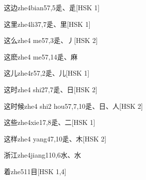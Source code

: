 \begin{entry}{这边}{zhe4bian5}{7,5}{⾡、⾡}[HSK 1]
\end{entry}

\begin{entry}{这里}{zhe4li3}{7,7}{⾡、⾥}[HSK 1]
\end{entry}

\begin{entry}{这么}{zhe4 me5}{7,3}{⾡、⼃}[HSK 2]
\end{entry}

\begin{entry}{这麽}{zhe4 me5}{7,14}{⾡、⿇}
\end{entry}

\begin{entry}{这儿}{zhe4r5}{7,2}{⾡、⼉}[HSK 1]
\end{entry}

\begin{entry}{这时}{zhe4 shi2}{7,7}{⾡、⽇}[HSK 2]
\end{entry}

\begin{entry}{这时候}{zhe4 shi2 hou5}{7,7,10}{⾡、⽇、⼈}[HSK 2]
\end{entry}

\begin{entry}{这些}{zhe4xie1}{7,8}{⾡、⼆}[HSK 1]
\end{entry}

\begin{entry}{这样}{zhe4 yang4}{7,10}{⾡、⽊}[HSK 2]
\end{entry}

\begin{entry}{浙江}{zhe4jiang1}{10,6}{⽔、⽔}
\end{entry}

\begin{entry}{着}{zhe5}{11}{⽬}[HSK 1,4]
\end{entry}

